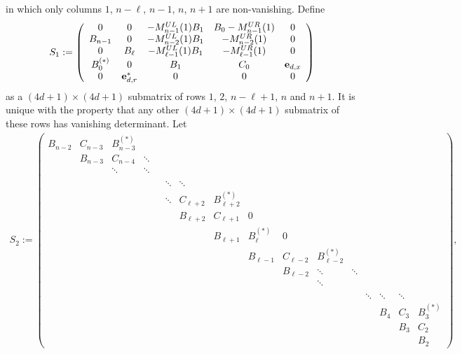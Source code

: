 \documentclass[11pt]{amsart}
\begin{document}
in which only columns $1$, $n-\ell$, $n-1$, $n$, $n+1$ are non-vanishing.
Define
\begin{align}
    S_1:=\left(\begin{array}{ccccc}
0 &0 &-M_{n-1}^{UL}(1)B_1 &B_0-M_{n-1}^{UR}(1) &0\\
B_{n-1} &0 &-M_{n-2}^{UL}(1)B_1 &-M_{n-2}^{UR}(1) &0\\
0 &B_\ell &-M_{\ell-1}^{UL}(1)B_1 &-M_{\ell-1}^{UR}(1) &0\\
B_0^{(*)} &0 &B_1 &C_0 &{\bf e}_{d,x}\\
0 &{\bf e}^*_{d,r} & 0 &0 &0
    \end{array}\right)
\end{align}
as a $(4d+1)\times (4d+1)$ submatrix of rows $1$, $2$, $n-\ell+1$, $n$ and $n+1$. It is unique with the property that any other  $(4d+1)\times (4d+1)$ submatrix of these rows has vanishing determinant. 
Let
\begin{align}
    S_2:=
    \left(\begin{array}{cccccccccccccccc}
       B_{n-2} &C_{n-3} &B_{n-3}^{(*)} & & & & & & & & & & & & &\\
          &B_{n-3}       &C_{n-4} &\ddots & & & & & & & & & & & &\\
          &        &\ddots  &\ddots & & & & & & & & & & & &\\
                   \\
          & & & & &\ddots &\ddots  & & & & & & & & &\\
          & & & & &\ddots &C_{\ell+2} &B_{\ell+2}^{(*)} & & & & & & & &\\
          & & & & &  &B_{\ell+2} &C_{\ell+1} &0 & & & & & & &\\
          & & & & &  & &B_{\ell+1} &B_{\ell}^{(*)} &0 & & & & & &\\
          & & & & &  & & &B_{\ell-1} &C_{\ell-2} &B_{\ell-2}^{(*)} & & & & &\\
          & & & & &  & & & &B_{\ell-2} &\ddots &\ddots & & & &\\
          & & & & &  & & & & &\ddots & & & & &\\
          \\
          & & & & &  & & & & & & &\ddots &\ddots &\ddots &\\
          & & & & &  & & & & & & & &B_4 &C_3 &B_3^{(*)}\\
          & & & & &  & & & & & & & & &B_3 &C_2   \\ 
          & & & & &  & & & & & & & & & &B_2         
    \end{array}\right),
\end{align}
\end{document}
